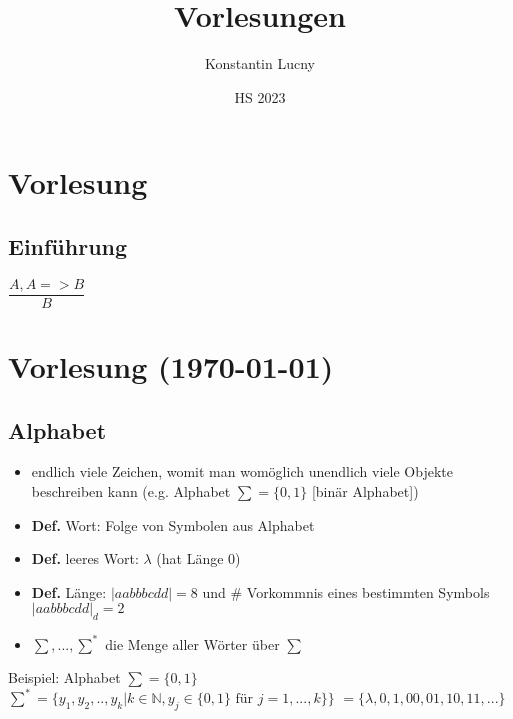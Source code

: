 \documentclass[a4paper,10pt]{article}
\title{Vorlesungen}
\author{Konstantin Lucny}
\date{HS 2023}
\begin{document}
\maketitle

\section{Vorlesung}
\subsection{Einführung}
$\dfrac{A, A=> B}{B}$
\section{Vorlesung (\today)}
\subsection{Alphabet}
\begin{itemize}
    \item endlich viele Zeichen, womit man womöglich unendlich viele Objekte beschreiben kann (e.g. Alphabet  $\sum=\{0,1\}$ [binär Alphabet])
    \item \textbf{Def. }Wort: Folge von Symbolen aus Alphabet
    \item \textbf{Def.} leeres Wort: $\lambda$ (hat Länge $0$)
    \item \textbf{Def.} Länge: $|aabbbcdd|=8$ und \# Vorkommnis eines bestimmten Symbols $|aabbbcdd|_d=2$
    \item $\sum,...,\sum^*$ die Menge aller Wörter über $\sum$
\end{itemize}
\begin{tipbox}
    {Beispiel: Alphabet}
    $\sum=\{0,1\}$
    \\ $\sum^*=\{y_1,y_2,..,y_k|k\in\mathbb N, y_j \in\{0,1\}  \text{ für } j=1,...,k\}\}$
    $ = \{\lambda, 0, 1, 00, 01, 10, 11,...\}$
\end{tipbox}
\end{document}
